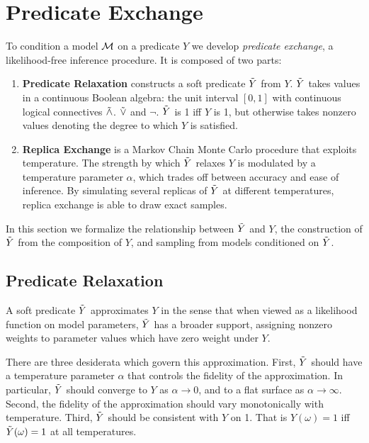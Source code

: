 \section{Predicate Exchange}

To condition a model ${\mathcal{M}}$ on a predicate $Y$ we develop \emph{predicate exchange}, a likelihood-free inference procedure.  It is composed of two parts:
\begin{enumerate}
\item \textbf{Predicate Relaxation} constructs a soft predicate $\tilde{Y}$ from $Y$. $\tilde{Y}$ takes values   in a continuous Boolean algebra: the unit interval $[0, 1]$ with continuous logical connectives $\mathrel{\tilde{\land}}$. $\mathrel{\tilde{\lor}}$ and $\neg$.
$\tilde{Y}$ is 1 iff $Y$ is 1, but otherwise takes nonzero values denoting the degree to which $Y$ is satisfied.
\item  \textbf{Replica Exchange} is a Markov Chain Monte Carlo procedure that exploits temperature. The strength by which $\tilde{Y}$ relaxes $Y$ is modulated by a temperature parameter $\alpha$, which trades off between accuracy and ease of inference.  By simulating several replicas of $\tilde{Y}$ at different temperatures, replica exchange is able to draw exact samples. 
\end{enumerate}

In this section we formalize the relationship between $\tilde{Y}$ and $Y$, the construction of $\tilde{Y}$ from the composition of $Y$, and sampling from models conditioned on $\mathrel{\tilde{Y}}$.

\subsection{Predicate Relaxation}\label{predexchange}

A soft predicate $\tilde{Y}$ approximates $Y$ in the sense that when viewed as a likelihood function on model parameters, $\tilde{Y}$ has a broader support, assigning nonzero weights to parameter values which have zero weight under $Y$.

There are three desiderata which govern this approximation.
First, $\tilde{Y}$ should have a temperature parameter $\alpha$ that controls the fidelity of the approximation. In particular, $\tilde{Y}$ should converge to $Y$ as $\alpha \to 0$, and to a flat surface as $\alpha \to \infty$. Second, the fidelity of the approximation should vary monotonically with temperature. Third, $\tilde{Y}$ should be consistent with $Y$ on 1. That is $Y(\omega) = 1$ iff $\tilde{Y}(\omega) = 1$ at all temperatures.  


